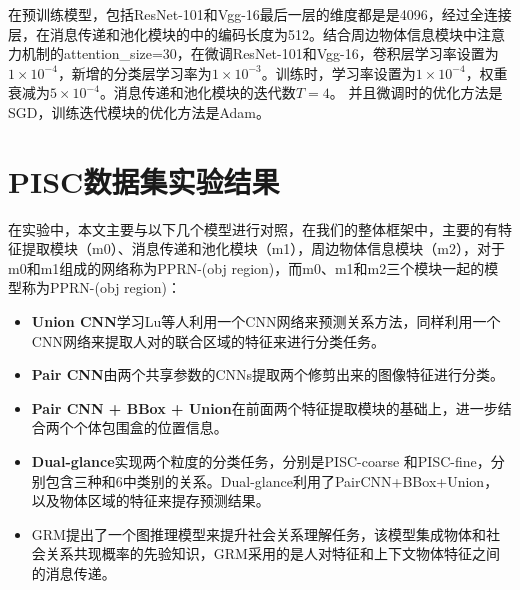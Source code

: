 在预训练模型，包括ResNet-101和Vgg-16最后一层的维度都是是4096，经过全连接层，在消息传递和池化模块的中的编码长度为512。结合周边物体信息模块中注意力机制的attention\_size=30，在微调ResNet-101和Vgg-16，卷积层学习率设置为$1 \times 10^{-4}$，新增的分类层学习率为$1 \times 10^{-3}$。训练时，学习率设置为$1 \times 10^{-4}$，权重衰减为$5 \times 10^{-4}$。消息传递和池化模块的迭代数$T=4$。 并且微调时的优化方法是SGD，训练迭代模块的优化方法是Adam。

\section{PISC数据集实验结果}
在实验中，本文主要与以下几个模型进行对照，在我们的整体框架中，主要的有特征提取模块（m0）、消息传递和池化模块（m1），周边物体信息模块（m2），对于m0和m1组成的网络称为PPRN-(obj region)，而m0、m1和m2三个模块一起的模型称为PPRN-(obj region)：
\begin{itemize}
    \item \textbf{Union CNN}学习Lu等人\cite{lu2016visual}利用一个CNN网络来预测关系方法，同样利用一个CNN网络来提取人对的联合区域的特征来进行分类任务。
    \item \textbf{Pair CNN}\cite{li2017dual-glance}由两个共享参数的CNNs提取两个修剪出来的图像特征进行分类。
    \item \textbf{Pair CNN + BBox + Union}\cite{li2017dual-glance}在前面两个特征提取模块的基础上，进一步结合两个个体包围盒的位置信息。
    \item \textbf{Dual-glance}\cite{li2017dual-glance}实现两个粒度的分类任务，分别是PISC-coarse 和PISC-fine，分别包含三种和6中类别的关系。Dual-glance利用了PairCNN+BBox+Union，以及物体区域的特征来提存预测结果。
    \item GRM\cite{wang2018deep}提出了一个图推理模型来提升社会关系理解任务，该模型集成物体和社会关系共现概率的先验知识，GRM采用的是人对特征和上下文物体特征之间的消息传递。
\end{itemize}

